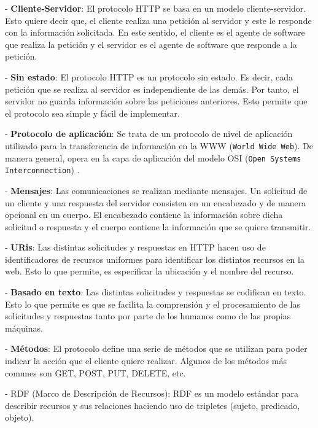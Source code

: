 \documentclass[11pt]{report}
\begin{document}
\indent \indent \indent - \textbf{Cliente-Servidor}: El protocolo HTTP se basa en un modelo cliente-servidor. Esto quiere decir que, el cliente realiza una petición al servidor y este le responde con la información solicitada. En este sentido, el cliente es el agente de software que realiza la petición y el servidor es el agente de software que responde a la petición.

\indent \indent \indent - \textbf{Sin estado}: El protocolo HTTP es un protocolo sin estado. Es decir, cada petición que se realiza al servidor es independiente de las demás. Por tanto, el servidor no guarda información sobre las peticiones anteriores. Esto permite que el protocolo sea simple y fácil de implementar.

\indent \indent \indent - \textbf{Protocolo de aplicación}: Se trata de un protocolo de nivel de aplicación utilizado para la transferencia de información en la WWW (\texttt{World Wide Web}). De manera general, opera en la capa de aplicación del modelo OSI (\texttt{Open Systems Interconnection}) \cite{1}. 

\indent \indent \indent - \textbf{Mensajes}: Las comunicaciones se realizan mediante mensajes. Un solicitud de un cliente y una respuesta del servidor consisten en un encabezado y de manera opcional en un cuerpo. El encabezado contiene la información sobre dicha solicitud o respuesta y el cuerpo contiene la información que se quiere transmitir.

\indent \indent \indent - \textbf{URis}: Las distintas solicitudes y respuestas en HTTP hacen uso de identificadores de recursos uniformes para identificar los distintos recursos en la web. Esto lo que permite, es especificar la ubicación y el nombre del recurso.

\indent \indent \indent - \textbf{Basado en texto}: Las distintas solicitudes y respuestas se codifican en texto.  Esto lo que permite es que se facilita la comprensión y el procesamiento de las solicitudes y respuestas tanto por parte de los humanos como de las propias máquinas.

\indent \indent \indent - \textbf{Métodos}: El protocolo define una serie de métodos que se utilizan para poder indicar la acción que el cliente quiere realizar. Algunos de los métodos más comunes son GET, POST, PUT, DELETE, etc.

- RDF (Marco de Descripción de Recursos): RDF es un modelo estándar para describir recursos y sus relaciones haciendo uso de tripletes (sujeto, predicado, objeto).
\end{document}
